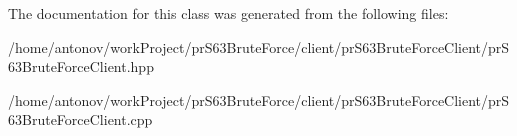 The documentation for this class was generated from the following files\+:\begin{DoxyCompactItemize}
\item 
/home/antonov/work\+Project/pr\+S63\+Brute\+Force/client/pr\+S63\+Brute\+Force\+Client/pr\+S63\+Brute\+Force\+Client.\+hpp\item 
/home/antonov/work\+Project/pr\+S63\+Brute\+Force/client/pr\+S63\+Brute\+Force\+Client/pr\+S63\+Brute\+Force\+Client.\+cpp\end{DoxyCompactItemize}
